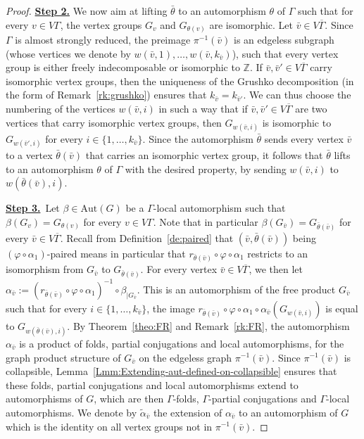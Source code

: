 \documentclass[a4paper,english,11pt]{article}
\theoremstyle{definition}
\theoremstyle{remark}
\newcommand{\Aut}{\mathrm{Aut}}
\begin{document}
\begin{proof}
\underline{\textbf{Step 2.}} We now aim at lifting $\bar\theta$ to an automorphism $\theta$ of $\Gamma$ such that for every $v\in V\Gamma$, the vertex groups $G_v$ and $G_{\theta(v)}$ are isomorphic.
Let $\bar v\in V\overline\Gamma$. Since $\Gamma$ is almost strongly reduced, the preimage $\pi^{-1}(\bar v)$ is an edgeless subgraph (whose vertices we denote by $w(\bar v,1),\dots,w(\bar v,k_{\bar v})$), such that every vertex group is either freely indecomposable or isomorphic to $\mathbb{Z}$. If $\bar v,\bar v'\in V\overline{\Gamma}$ carry isomorphic vertex groups, then the uniqueness of the Grushko decomposition (in the form of Remark~\ref{rk:grushko}) ensures that $k_{\bar v}=k_{\bar v'}$. We can thus choose the numbering of the vertices $w(\bar v,i)$ in such a way that if $\bar v,\bar v'\in V\overline\Gamma$ are two vertices that carry isomorphic vertex groups, then $G_{w(\bar v,i)}$ is isomorphic to $G_{w(\bar v',i)}$ for every $i\in\{1,\dots,k_{\bar v}\}$. Since the automorphism $\bar\theta$ sends every vertex $\bar v$ to a vertex $\bar\theta(\bar v)$ that carries an isomorphic vertex group, it follows that $\bar\theta$ lifts to an automorphism $\theta$ of $\Gamma$ with the desired property, by sending $w(\bar v,i)$ to $w(\bar\theta(\bar v),i)$.

\medskip
 
\underline{\textbf{Step 3.}}~Let $\beta\in\Aut(G)$ be a $\Gamma$-local automorphism such that $\beta(G_v)=G_{\theta(v)}$ for every $v\in V\Gamma$. Note that in particular $\beta(G_{\bar v})=G_{\bar\theta(\bar v)}$ for every $\bar v\in V\overline{\Gamma}$. Recall from Definition~\ref{de:paired} that $(\bar v,\bar\theta(\bar v))$ being $(\varphi\circ\alpha_1)$-paired means in particular that $r_{\bar\theta(\bar v)}\circ\varphi\circ\alpha_1$ restricts to an isomorphism from $G_{\bar v}$ to $G_{\bar\theta(\bar v)}$. For every vertex $\bar v\in V\overline{\Gamma}$, we then let $\alpha_{\bar v}:=(r_{\bar\theta(\bar v)}\circ\varphi\circ\alpha_1)^{-1}\circ\beta_{|G_{\bar v}}$. This is an automorphism of the free product $G_{\bar v}$ such that for every $i\in\{1,\dots,k_{\bar v}\}$, the image  $r_{\bar\theta(\bar v)}\circ\varphi\circ\alpha_1\circ\alpha_{\bar v}(G_{w(\bar v,i)})$ is equal to $G_{w(\bar\theta(\bar v),i)}$. By Theorem~\ref{theo:FR} and Remark~\ref{rk:FR}, the automorphism $\alpha_{\bar v}$ is a product of folds, partial conjugations and local automorphisms, for the graph product structure of $G_{\bar v}$ on the edgeless graph $\pi^{-1}(\bar v)$. Since $\pi^{-1}(\bar v)$ is collapsible, Lemma~\ref{Lmm:Extending-aut-defined-on-collapsible} ensures that these folds, partial conjugations and local automorphisms extend to automorphisms of $G$, which are then $\Gamma$-folds, $\Gamma$-partial conjugations and $\Gamma$-local automorphisms. We denote by $\tilde{\alpha}_{\bar v}$ the extension of $\alpha_{\bar v}$ to an automorphism of $G$ which is the identity on all vertex groups not in $\pi^{-1}(\bar v)$. 


\end{proof}
\end{document}

